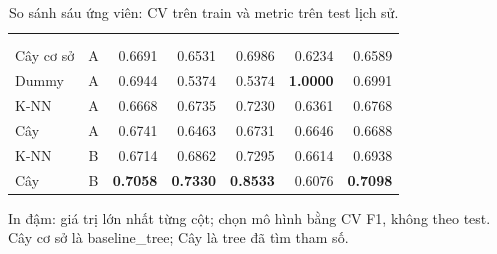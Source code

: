 \begin{table}[!htbp]\centering
\caption{So sánh sáu ứng viên: CV trên train và metric trên test lịch sử.}\label{tab:metrics}
\begin{tabularx}{\linewidth}{|Y|c|r|r|r|r|r|}\hline
{} &  &  \\
 &  &  &  &  &  &  \\\hline
Cây cơ sở & A & 0.6691 & 0.6531 & 0.6986 & 0.6234 & 0.6589 \\
Dummy & A & 0.6944 & 0.5374 & 0.5374 & \textbf{1.0000} & 0.6991 \\
K-NN & A & 0.6668 & 0.6735 & 0.7230 & 0.6361 & 0.6768 \\
Cây & A & 0.6741 & 0.6463 & 0.6731 & 0.6646 & 0.6688 \\
K-NN & B & 0.6714 & 0.6862 & 0.7295 & 0.6614 & 0.6938 \\
Cây & B & \textbf{0.7058} & \textbf{0.7330} & \textbf{0.8533} & 0.6076 & \textbf{0.7098} \\
\hline\end{tabularx}
\par\smallskip\raggedright In đậm: giá trị lớn nhất từng cột; chọn mô hình bằng CV F1, không theo test. Cây cơ sở là baseline\_tree; Cây là tree đã tìm tham số.
\end{table}

